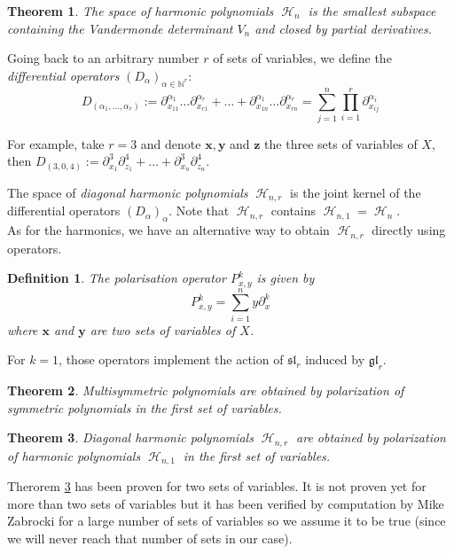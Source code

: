 \documentclass[letter,12pt]{article}
\newcommand{\NN}{\mathbb{N}}
\DeclareMathOperator{\harmonics}{\mathcal{H}}
\newtheorem{theorem}{Theorem}
\newtheorem{definition}{Definition}
\begin{document}
	\begin{theorem}
		The space of harmonic polynomials $\harmonics_{n}$ is the smallest subspace containing the Vandermonde determinant $V_n$ and closed by partial derivatives.
	\end{theorem}
	
	Going back to an arbitrary number $r$ of sets of variables, we define the \emph{differential operators} $(D_\alpha)_{\alpha\in \NN^r}$:
	$$D_{(\alpha_1, \dots, \alpha_r)} := \partial_{x_{11}}^{\alpha_1}\dots\partial_{x_{r1}}^{\alpha_r} + \dots + \partial_{x_{1n}}^{\alpha_1}\dots\partial_{x_{rn}}^{\alpha_r} = \sum_{j=1}^{n} \prod_{i=1}^{r} \partial_{x_{ij}}^{\alpha_i}$$
	
	For example, take $r=3$ and denote $\bm{x}, \bm{y}$ and $\bm{z}$ the three sets of variables of $X$, then $D_{(3,0,4)} := \partial_{x_1}^3\partial_{z_1}^4 + \dots + \partial_{x_n}^3\partial_{z_n}^4$. 
	
	The space of \emph{diagonal harmonic polynomials} $\harmonics_{n,r}$ is the joint kernel of the differential operators $(D_\alpha)_\alpha$. Note that $\harmonics_{n,r}$ contains $\harmonics_{n,1} = \harmonics_{n}$.\\
	
	As for the harmonics, we have an alternative way to obtain $\harmonics_{n,r}$ directly using operators. 
	
	\begin{definition}
		The \emph{polarisation operator} $P_{x,y}^k$ is given by
		$$P_{x,y}^k = \sum_{i=1}^{n} y \partial_{x}^k$$
		where $\bm{x}$ and $\bm{y}$ are two sets of variables of $X$. 
	\end{definition}
	
	For $k=1$, those operators implement the action of $\mathfrak{sl}_r$ induced by $\mathfrak{gl}_r$.
	
	\begin{theorem}
		Multisymmetric polynomials are obtained by polarization of symmetric polynomials in the first set of variables.
	\end{theorem}
	
	\begin{theorem} \label{DiagHarm}
		Diagonal harmonic polynomials $\harmonics_{n,r}$ are obtained by polarization of harmonic polynomials $\harmonics_{n,1}$ in the first set of variables.
	\end{theorem}
	
	Therorem \ref{DiagHarm} has been proven for two sets of variables. It is not proven yet for more than two sets of variables but it has been verified by computation by Mike Zabrocki for a large number of sets of variables so we assume it to be true (since we will never reach that number of sets in our case).  \\
	
\end{document}
